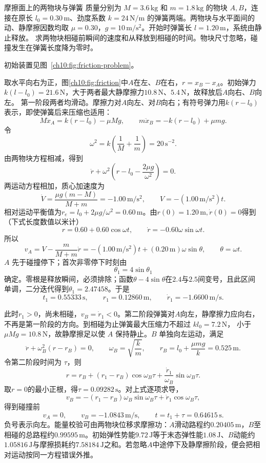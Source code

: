 \begin{origexamplebox}{摩擦面上的两物块与弹簧}\label{ch10:ex:friction}
质量分别为 $M=3.6\,\mathrm{kg}$ 和 $m=1.8\,\mathrm{kg}$ 的物块 $A,B$，连接在原长
$l_0=0.30\,\mathrm m$、劲度系数 $k=24\,\mathrm{N/m}$ 的弹簧两端。两物块与水平面间的动、静摩擦因数均取
$\mu=0.30$，$g=10\,\mathrm{m/s^2}$。开始时弹簧长 $l=1.20\,\mathrm m$，系统由静止释放。
求两物块相碰前瞬间的速度和从释放到相碰的时间。物块尺寸忽略，碰撞发生在弹簧长度降为零时。

初始装置见图~\ref{ch10:fig:friction-problem}。
\chTenFrictionProblemFigure
\end{origexamplebox}
\begin{xesolution}
取水平向右为正，图\ref{ch10:fig:friction}中$A$在左、$B$在右，$r=x_B-x_A$。初始弹力$k(l-l_0)=21.6\,\mathrm N$，大于两者最大静摩擦力$10.8\,\mathrm N$、$5.4\,\mathrm N$，故释放后$A$向右、$B$向左。
\chTenFrictionFigure
第一阶段两者均滑动。摩擦力对$A$向左、对$B$向右；有符号弹力用$k(r-l_0)$表示，即使弹簧后来压缩也适用：
\[
 M\ddot x_A=k(r-l_0)-\mu Mg,\qquad
 m\ddot x_B=-k(r-l_0)+\mu mg.
\]
令
\[
 \omega^2=k\left(\frac1M+\frac1m\right)=20\,\mathrm{s^{-2}}.
\]
由两物块方程相减，得到
\[
 \ddot r+\omega^2\left(r-l_0-\frac{2\mu g}{\omega^2}\right)=0.
\]
两运动方程相加，质心加速度为
\[
 \dot V=\frac{\mu g(m-M)}{M+m}=-1.00\,\mathrm{m/s^2},
 \qquad V=-(1.00\,\mathrm{m/s^2})t.
\]
相对运动平衡值为$r_e=l_0+2\mu g/\omega^2=0.60\,\mathrm m$。由$r(0)=1.20\,\mathrm m,\dot r(0)=0$得到（下式长度数值以米计）
\[
 r=0.60+0.60\cos\omega t,\qquad
 \dot r=-0.60\omega\sin\omega t.
\]
所以
\[
 v_A=V-\frac{m}{M+m}\dot r
 =-(1.00\,\mathrm{m/s^2})t+(0.20\,\mathrm m)\omega\sin\theta,
 \qquad \theta=\omega t.
\]
$A$ 先于碰撞停下；首次非零停下时刻由
\[
 \theta_1=4\sin\theta_1
\]
确定。零根是释放瞬间，必须排除；函数$\theta-4\sin\theta$在$2.4$与$2.5$间变号，且此区间单调，二分迭代得到$\theta_1=2.47458$。于是
\[
 t_1=0.55333\,\mathrm s,\qquad
 r_1=0.12860\,\mathrm m,\qquad
 \dot r_1=-1.6600\,\mathrm{m/s}.
\]

此时$r_1>0$，尚未相碰，$v_B=\dot r_1<0$。第二阶段弹簧对$A$向左，静摩擦力应向右，不再是第一阶段的方向。到相碰为止弹簧最大压缩力不超过 $kl_0=7.2\,\mathrm N$，
小于 $\mu Mg=10.8\,\mathrm N$，故静摩擦足以使 $A$ 保持静止。$B$ 单独向左运动，满足
\[
 \ddot r+\omega_B^2(r-r_B)=0,\qquad
 \omega_B=\sqrt{\frac{k}{m}},\qquad
 r_B=l_0+\frac{\mu mg}{k}=0.525\,\mathrm m.
\]
令第二阶段时间为 $\tau$，则
\[
 r=r_B+(r_1-r_B)\cos\omega_B\tau
 +\frac{\dot r_1}{\omega_B}\sin\omega_B\tau.
\]
取$r=0$的最小正根，得$\tau=0.09282\,\mathrm s$。对上式逐项求导，
\[
 v_B=-(r_1-r_B)\omega_B\sin\omega_B\tau+\dot r_1\cos\omega_B\tau,
\]
得到碰撞前
\[
 \boxed{v_A=0},\qquad
 \boxed{v_B=-1.0843\,\mathrm{m/s}},\qquad
 \boxed{t=t_1+\tau=0.64615\,\mathrm s}.
\]
负号表示向左。能量校验可由两物块位移求摩擦功：$A$滑动路程约$0.20405\,\mathrm m$，$B$至相碰的总路程约$0.99595\,\mathrm m$。初始弹性势能$9.72\,\mathrm J$等于末态弹性能$1.08\,\mathrm J$、$B$动能约$1.05816\,\mathrm J$与摩擦损耗约$7.58184\,\mathrm J$之和。若忽略$A$中途停下及静摩擦阶段，便会把相对运动按同一方程错误外推。
\end{xesolution}

